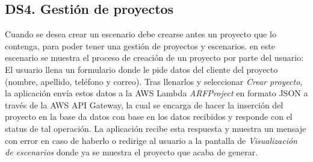 \subsection{DS4. Gestión de proyectos}
Cuando se desea crear un escenario debe crearse antes un proyecto que lo contenga, para poder tener una gestión de proyectos y escenarios. en este escenario se muestra el proceso de creación de un proyecto por parte del usuario: El usuario llena un formulario donde le pide datos del cliente del proyecto (nombre, apellido, teléfono y correo). Tras llenarlos y seleccionar \textit{Crear proyecto}, la aplicación envía estos datos a la AWS Lambda \textit{ARFProject} en formato JSON a través de la AWS API Gateway, la cual se encarga de hacer la inserción del proyecto en la base da datos con base en los datos recibidos y responde con el status de tal operación. La aplicación recibe esta respuesta y muestra un mensaje con error en caso de haberlo o redirige al usuario a la pantalla de \textit{Visualización de escenarios} donde ya se muestra el proyecto que acaba de generar.
